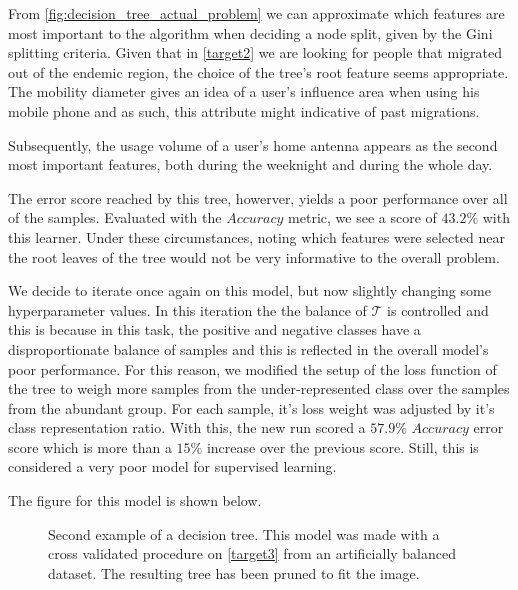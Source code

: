 \smallskip


From \cref{fig:decision_tree_actual_problem} we can approximate which features are most important to the algorithm when deciding a node split, given by the Gini splitting criteria.
Given that in \cref{target2} we are looking for people that migrated out of the endemic region, the choice of the tree's root feature seems appropriate.
The mobility diameter gives an idea of a user's influence area when using his mobile phone and as such, this attribute might indicative of past migrations.

Subsequently, the usage volume of a user's home antenna appears as the second most important features, both during the weeknight and during the whole day.

The error score reached by this tree, howerver, yields a poor performance over all of the samples.
Evaluated with the $Accuracy$ metric, we see a score of $43.2\%$ with this learner.
Under these circumstances, noting which features were selected near the root leaves of the tree would not be very informative to the overall problem.

We decide to iterate once again on this model, but now slightly changing some hyperparameter values. 
In this iteration the the balance of $\mathcal{T}$ is controlled and this is because in this task, the positive and negative classes have a disproportionate balance of samples and this is reflected in the overall model's poor performance.
For this reason, we modified the setup of the loss function of the tree to weigh more samples from the under-represented class over the samples from the abundant group.
For each sample, it's loss weight was adjusted by it's class representation ratio.
With this, the new run scored a $57.9\%$ $Accuracy$ error score which is more than a $15\%$ increase over the previous score.
Still, this is considered a very poor model for supervised learning.

The figure for this model is shown below.

\bigskip

\begin{figure}
	\centering
	\caption{ Second example of a decision tree.
		This model was made with a cross validated procedure on \cref{target3} from an artificially balanced dataset.
		The resulting tree has been pruned to fit the image.}
	\label{fig:decision_tree_actual_problem2}
\end{figure}


